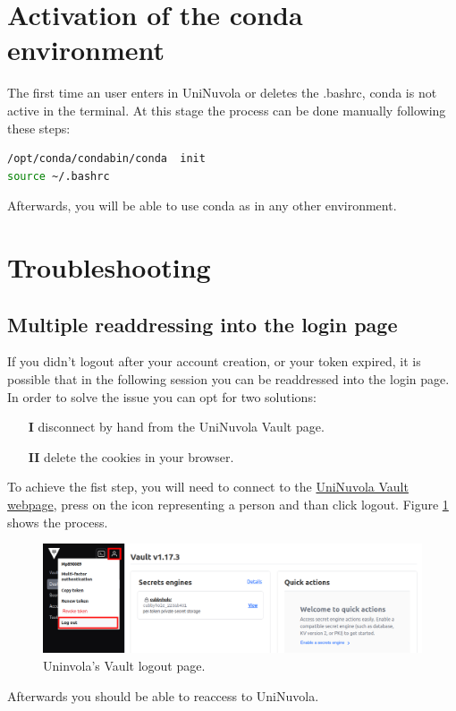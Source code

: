 \documentclass[a4paper,11pt]{article}
\begin{document}
\section{Activation of the conda environment}
The first time an user enters in UniNuvola or deletes the .bashrc, conda is not active in the terminal. At this stage the process can be done manually following these steps:
\begin{lstlisting}[language=bash] 
/opt/conda/condabin/conda  init
source ~/.bashrc
\end{lstlisting}
Afterwards, you will be able to use conda as in any other environment.

\section{Troubleshooting}
\subsection{Multiple readdressing into the login page}
If you didn't logout after your account creation, or your token expired, it is possible that in the following session you can be readdressed into the login page.  In order to solve the issue you can opt for two solutions:
\begin{itemize}
    \item[\textbf{I}] disconnect by hand from the UniNuvola Vault page.  
    \item[\textbf{II}] delete the cookies in your browser. 
\end{itemize}

To achieve the fist step, you will need to connect to the \href{https://vault.uninuvola.unipg.it:8200/ui/vault/dashboard}{UniNuvola Vault webpage}, press on the icon representing a person and than click logout. Figure \ref{img:logout} shows the process.      \\
\begin{figure}[!h]
    \center
    \includegraphics[width=0.8\linewidth]{img/vault.png}
    \caption{Uninvola's Vault logout page.}
    \label{img:logout}
\end{figure}

Afterwards you should be able to reaccess to UniNuvola.
\end{document}
